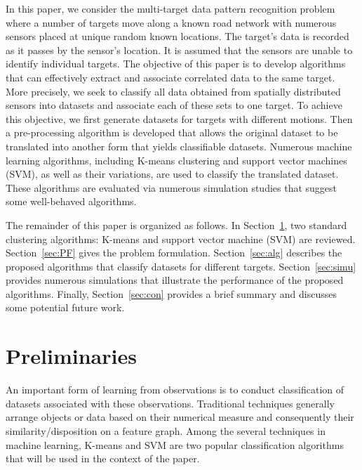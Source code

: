 \documentclass[letterpaper, 10 pt, conference]{ieeeconf}
\begin{document}
In this paper, we consider the multi-target data pattern recognition problem where a number of targets move along a known road network with numerous sensors placed at unique random known locations. The target's data is recorded as it passes by the sensor's location. It is assumed that the sensors are unable to identify individual targets. The objective of this paper is to develop algorithms that can effectively extract and associate correlated data to the same target. More precisely, we seek to classify all data obtained from spatially distributed sensors into datasets and associate each of these sets to one target. To achieve this objective, we first generate datasets for targets with different motions. Then a pre-processing algorithm is developed that allows the original dataset to be translated into another form that yields classifiable datasets. Numerous machine learning algorithms, including K-means clustering and support vector machines (SVM), as well as their variations, are used to classify the translated dataset. These algorithms are evaluated via numerous simulation studies that suggest some well-behaved algorithms. 

The remainder of this paper is organized as follows. In Section~\ref{sec:pre}, two standard clustering algorithms: K-means and support vector machine (SVM) are reviewed. Section~\ref{sec:PF} gives the problem formulation. Section~\ref{sec:alg} describes the proposed algorithms that classify datasets for different targets. Section~\ref{sec:simu} provides numerous simulations that illustrate the performance of the proposed algorithms. Finally, Section~\ref{sec:con} provides a brief summary and discusses some potential future work.





\section{Preliminaries}\label{sec:pre}

An important form of learning from observations is to conduct classification of datasets associated with these observations. Traditional techniques generally arrange objects or data based on their numerical measure and consequently their similarity/disposition on a feature graph\cite{michalski1983learning}. Among the several techniques in machine learning, K-means and SVM are two popular classification algorithms that will be used in the context of the paper.
\end{document}
